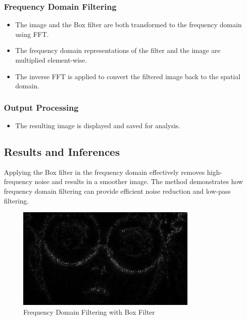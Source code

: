\documentclass[12pt,a4paper]{article}
\begin{document}
\subsubsection{Frequency Domain Filtering}
\begin{itemize}
  \item The image and the Box filter are both transformed to the frequency domain using FFT.
  \item The frequency domain representations of the filter and the image are multiplied element-wise.
  \item The inverse FFT is applied to convert the filtered image back to the spatial domain.
\end{itemize}

\subsubsection{Output Processing}
\begin{itemize}
  \item The resulting image is displayed and saved for analysis.
\end{itemize}

\subsection{Results and Inferences}
Applying the Box filter in the frequency domain effectively removes high-frequency noise and results in a smoother image. The method demonstrates how frequency domain filtering can provide efficient noise reduction and low-pass filtering.

\begin{figure}[H]
  \centering
  \includegraphics[width=0.8\textwidth]{freq_box/box_filtered.jpg}
  \caption{Frequency Domain Filtering with Box Filter}
  \label{fig:box_filter}
\end{figure}

\newpage
\end{document}
